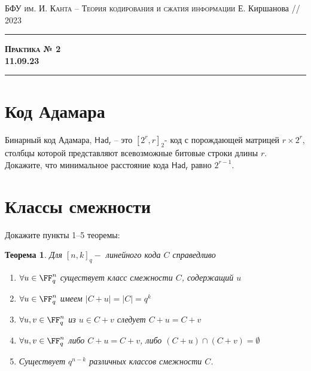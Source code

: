 \documentclass[11pt]{exam}
\newtheorem{theorem}{Теорема}
\theoremstyle{definition}
\begin{document}
	{\noindent
		\textsc{БФУ им. И. Канта -- Теория кодирования и сжатия информации}
		\hfill {Е. Киршанова // 2023\\}
	\hrule
	\begin{center}
		{\Large\textbf{
				\textsc{Практика № 2} \\[5pt] {11.09.23}
		} } 
	\end{center}
	\hrule \vspace{5mm}
	
	\thispagestyle{empty}
	
	\vspace{0.2cm}
	
\section{Код Адамара}
Бинарный код Адамара, $\mathsf{Had_r}$ -- это  $[2^r, r]_2$- код с порождающей матрицей $r \times 2^r$, столбцы которой представляют всевозможные битовые строки длины $r$. Докажите, что минимальное расстояние кода $\mathsf{Had_r}$  равно $2^{r-1}$.
	
\section{Классы смежности}
Докажите пункты 1--5 теоремы:
\begin{theorem}
	Для $[n,k]_q-$ линейного кода $C$ справедливо
	\begin{enumerate}
		\item $\forall u \in \FF_q^n$ существует класс смежности $C$, содержащий $u$
		\item $\forall u \in \FF_q^n$ имеем $|C+u| = |C| = q^k$
		\item $\forall u, v\in \FF_q^n$ из $u \in C+v$ следует $C+u  = C + v$
		\item $\forall u, v\in \FF_q^n$ либо $C+u = C+v$, либо $(C+u) \cap (C+v) = \emptyset$
		\item  Существует $q^{n-k}$ различных классов смежности $C$.
	\end{enumerate}
\end{theorem} 

}
\end{document}
